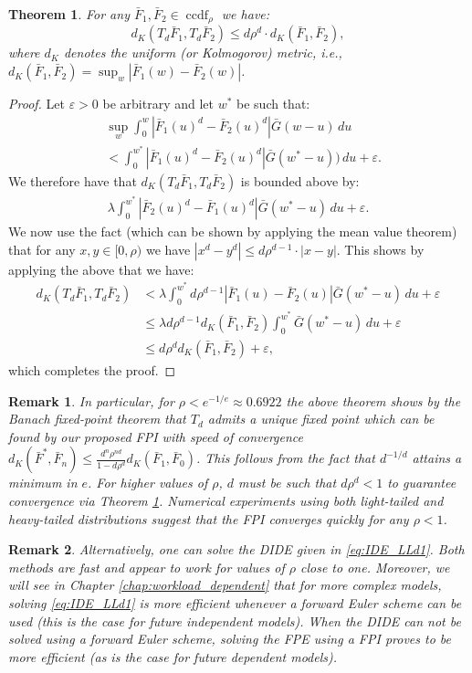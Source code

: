\documentclass[12pt]{report}
\newtheorem{theorem}{Theorem}
\newtheorem{remark}{Remark}
\begin{document}
\begin{theorem}\label{operator_eig}
For any $\bar F_1,\bar F_2 \in \operatorname{ccdf}_{\rho}$ we have:
$$
d_K(T_d\bar F_1,T_d\bar F_2) \leq d \rho^d \cdot d_K(\bar F_1, \bar F_2),
$$
where $d_K$ denotes the uniform (or Kolmogorov) metric, i.e.,
$d_K(\bar F_1, \bar F_2) = \sup_w |\bar F_1(w)-\bar F_2(w)|$.
\end{theorem}
\begin{proof}
Let $\varepsilon > 0$ be arbitrary and let $w^*$ be such that:
\begin{align*}
&\sup_w \int_0^w |\bar F_1(u)^d - \bar F_2(u)^d| \bar G(w-u)\, du\\
&<
\int_0^{w^*} |\bar F_1(u)^d -  \bar F_2(u)^d| \bar G(w^*-u))\, du + \varepsilon.
\end{align*}
We therefore have that $d_K(T_d\bar F_1,T_d\bar F_2)$ is bounded above by:
\begin{align*}
\lambda \int_0^{w^*} |\bar F_2(u)^d - \bar F_1(u)^d| \bar G(w^*-u)\, du + \varepsilon.
\end{align*}
We now use the fact (which can be shown by applying the mean value theorem) that for any $x,y \in [0,\rho)$
we have $|x^d - y^d| \leq d  \rho^{d-1} \cdot |x-y|$. This shows by applying the above that we have:
\begin{align*}
d_K(T_d\bar F_1,T_d\bar F_2)
&
< \lambda \int_0^{w^*} d \rho^{d-1} |\bar F_1(u) - \bar F_2(u)| \bar G(w^*-u)\, du + \varepsilon\\
&
\leq \lambda d \rho^{d-1} d_K(\bar F_1,\bar F_2) \int_0^{w^*} \bar G(w^*-u)\, du + \varepsilon\\
&\leq d \rho^{d} d_K(\bar F_1,\bar F_2) + \varepsilon,
\end{align*}
which completes the proof.
\end{proof}

\begin{remark}
In particular, for $\rho < e^{-1/e} \approx 0.6922$ the above theorem shows by the Banach fixed-point theorem that $T_d$ admits a unique fixed point which can be found by our proposed FPI with speed of convergence $d_K(\bar F^*, \bar F_n) \leq \frac{d^n \rho^{nd}}{1 - d \rho^d} d_K(\bar F_1,\bar F_0)$. 
This follows from the fact that $d^{-1/d}$ attains a minimum in $e$. For higher values of 
$\rho$, $d$ must be such that $d \rho^d < 1$ to guarantee convergence via Theorem \ref{operator_eig}.
Numerical experiments using both light-tailed and heavy-tailed distributions suggest that the FPI converges quickly for any $\rho < 1$. 
\end{remark}
\begin{remark}
Alternatively, one can solve the DIDE given in \eqref{eq:IDE_LLd1}. Both methods are fast and appear to work for values of $\rho$ close to one. Moreover, we will see in Chapter \ref{chap:workload_dependent} that for more complex models, solving \eqref{eq:IDE_LLd1} is more efficient whenever a forward Euler scheme can be used (this is the case for future independent models). When the DIDE can not be solved using a forward Euler scheme, solving the FPE using a FPI proves to be more efficient (as is the case for future dependent models).
\end{remark}
\end{document}
